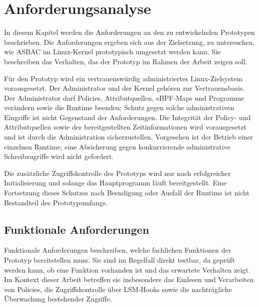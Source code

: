 \section{Anforderungsanalyse}
In diesem Kapitel werden die Anforderungen an den zu entwickelnden Prototypen beschrieben. 
Die Anforderungen ergeben sich aus der Zielsetzung, zu untersuchen, wie ASBAC im Linux-Kernel prototypisch umgesetzt werden kann.
Sie beschreiben das Verhalten, das der Prototyp im Rahmen der Arbeit zeigen soll.

Für den Prototyp wird ein vertrauenswürdig administriertes Linux-Zielsystem vorausgesetzt. Der Administrator und der Kernel gehören zur Vertrauensbasis. Der Administrator darf Policies, Attributquellen, eBPF-Maps und Programme verändern sowie die Runtime beenden; Schutz gegen solche administrativen Eingriffe ist nicht Gegenstand der Anforderungen. Die Integrität der Policy- und Attributquellen sowie der bereitgestellten Zeitinformationen wird vorausgesetzt und ist durch die Administration sicherzustellen. Vorgesehen ist der Betrieb einer einzelnen Runtime; eine Absicherung gegen konkurrierende administrative Schreibzugriffe wird nicht gefordert.

Die zusätzliche Zugriffskontrolle des Prototyps wird nur nach erfolgreicher Initialisierung und solange das Hauptprogramm läuft bereitgestellt. Eine Fortsetzung dieses Schutzes nach Beendigung oder Ausfall der Runtime ist nicht Bestandteil des Prototypumfangs.

\subsection{Funktionale Anforderungen}

Funktionale Anforderungen beschreiben, welche fachlichen Funktionen der Prototyp bereitstellen muss. 
Sie sind im Regelfall direkt testbar, da geprüft werden kann, ob eine Funktion vorhanden ist und das erwartete Verhalten zeigt. 
Im Kontext dieser Arbeit betreffen sie insbesondere das Einlesen und Verarbeiten von Policies, die Zugriffskontrolle über LSM-Hooks sowie die nachträgliche Überwachung bestehender Zugriffe.

